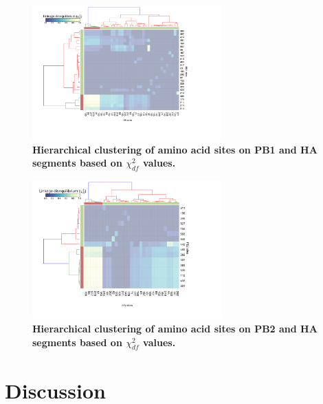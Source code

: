 \documentclass[11pt,oneside,letterpaper]{article}
\begin{document}
\begin{figure}[h]
	\centering	
	\includegraphics[width=0.65\textwidth]	{figures/Chi_PB1_HA.png}
	\caption{\textbf{Hierarchical clustering of amino acid sites on PB1 and HA segments based on $\chi^{2}_{df}$ values.}}
	\label{ChiPB1HA}
\end{figure}

\begin{figure}[h]
	\centering	
	\includegraphics[width=0.65\textwidth]	{figures/Chi_PB2_HA.png}
	\caption{\textbf{Hierarchical clustering of amino acid sites on PB2 and HA segments based on $\chi^{2}_{df}$ values.}}
	\label{ChiPB2HA}
\end{figure}


\section*{Discussion}
\end{document}
